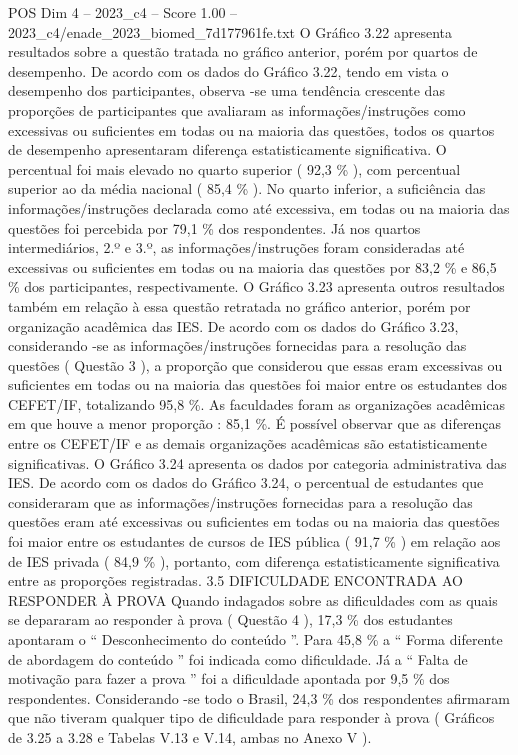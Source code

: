 \begin{textsample}{POS Dim 4 – 2023\_c4 – Score 1.00 – 2023\_c4/enade\_2023\_biomed\_7d177961fe.txt}
O Gráfico 3.22 apresenta resultados sobre a questão tratada no gráfico anterior, porém por quartos de desempenho.
De acordo com os dados do Gráfico 3.22, tendo em vista o desempenho dos participantes, observa -se uma tendência crescente das proporções de participantes que avaliaram as informações/instruções como excessivas ou suficientes em todas ou na maioria das questões, todos os quartos de desempenho apresentaram diferença estatisticamente significativa.
O percentual foi mais elevado no quarto superior ( 92,3 \% ), com percentual superior ao da média nacional ( 85,4 \% ).
No quarto inferior, a suficiência das informações/instruções declarada como até excessiva, em todas ou na maioria das questões foi percebida por 79,1 \% dos respondentes.
Já nos quartos intermediários, 2.º e 3.º, as informações/instruções foram consideradas até excessivas ou suficientes em todas ou na maioria das questões por 83,2 \% e 86,5 \% dos participantes, respectivamente.
O Gráfico 3.23 apresenta outros resultados também em relação à essa questão retratada no gráfico anterior, porém por organização acadêmica das IES.
De acordo com os dados do Gráfico 3.23, considerando -se as informações/instruções fornecidas para a resolução das questões ( Questão 3 ), a proporção que considerou que essas eram excessivas ou suficientes em todas ou na maioria das questões foi maior entre os estudantes dos CEFET/IF, totalizando 95,8 \%.
As faculdades foram as organizações acadêmicas em que houve a menor proporção : 85,1 \%.
É possível observar que as diferenças entre os CEFET/IF e as demais organizações acadêmicas são estatisticamente significativas.
O Gráfico 3.24 apresenta os dados por categoria administrativa das IES.
De acordo com os dados do Gráfico 3.24, o percentual de estudantes que consideraram que as informações/instruções fornecidas para a resolução das questões eram até excessivas ou suficientes em todas ou na maioria das questões foi maior entre os estudantes de cursos de IES pública ( 91,7 \% ) em relação aos de IES privada ( 84,9 \% ), portanto, com diferença estatisticamente significativa entre as proporções registradas. 3.5 DIFICULDADE ENCONTRADA AO RESPONDER À PROVA Quando indagados sobre as dificuldades com as quais se depararam ao responder à prova ( Questão 4 ), 17,3 \% dos estudantes apontaram o “ Desconhecimento do conteúdo ”.
Para 45,8 \% a “ Forma diferente de abordagem do conteúdo ” foi indicada como dificuldade.
Já a “ Falta de motivação para fazer a prova ” foi a dificuldade apontada por 9,5 \% dos respondentes.
Considerando -se todo o Brasil, 24,3 \% dos respondentes afirmaram que não tiveram qualquer tipo de dificuldade para responder à prova ( Gráficos de 3.25 a 3.28 e Tabelas V.13 e V.14, ambas no Anexo V ).

\end{textsample}
